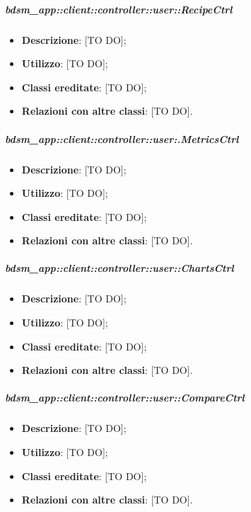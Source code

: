 		\subparagraph{bdsm\_app::client::controller::user::RecipeCtrl} %
		\label{subp:client_controller_user_recipectrl}
			\begin{itemize}
				\item \textbf{Descrizione}: [TO DO];
				\item \textbf{Utilizzo}: [TO DO];
				\item \textbf{Classi ereditate}: [TO DO];
				\item \textbf{Relazioni con altre classi}: [TO DO].
			\end{itemize}

		\subparagraph{bdsm\_app::client::controller::user:.MetricsCtrl} %
		\label{subp:client_controller_user_metricsctrl}
			\begin{itemize}
				\item \textbf{Descrizione}: [TO DO];
				\item \textbf{Utilizzo}: [TO DO];
				\item \textbf{Classi ereditate}: [TO DO];
				\item \textbf{Relazioni con altre classi}: [TO DO].
			\end{itemize}

		\subparagraph{bdsm\_app::client::controller::user::ChartsCtrl} %
		\label{subp:client_controller_user_chartsctrl}
			\begin{itemize}
				\item \textbf{Descrizione}: [TO DO];
				\item \textbf{Utilizzo}: [TO DO];
				\item \textbf{Classi ereditate}: [TO DO];
				\item \textbf{Relazioni con altre classi}: [TO DO].
			\end{itemize}

		\subparagraph{bdsm\_app::client::controller::user::CompareCtrl} %
		\label{subp:client_controller_user_comparectrl}
			\begin{itemize}
				\item \textbf{Descrizione}: [TO DO];
				\item \textbf{Utilizzo}: [TO DO];
				\item \textbf{Classi ereditate}: [TO DO];
				\item \textbf{Relazioni con altre classi}: [TO DO].
			\end{itemize}

